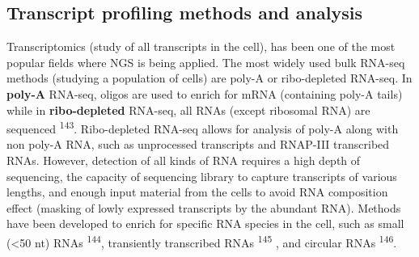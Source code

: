 \documentclass[11pt,twoside]{MPIthesis}
\theoremstyle{definition}
\theoremstyle{definition}
\theoremstyle{definition}
\theoremstyle{remark}
\begin{document}
\subsection{Transcript profiling methods and
analysis}\label{transcript-profiling-methods-and-analysis}

Transcriptomics (study of all transcripts in the cell), has been one of
the most popular fields where NGS is being applied. The most widely used
bulk RNA-seq methods (studying a population of cells) are poly-A or
ribo-depleted RNA-seq. In \textbf{poly-A} RNA-seq, oligos are used to
enrich for mRNA (containing poly-A tails) while in
\textbf{ribo-depleted} RNA-seq, all RNAs (except ribosomal RNA) are
sequenced \textsuperscript{143}. Ribo-depleted RNA-seq allows for
analysis of poly-A along with non poly-A RNA, such as unprocessed
transcripts and RNAP-III transcribed RNAs. However, detection of all
kinds of RNA requires a high depth of sequencing, the capacity of
sequencing library to capture transcripts of various lengths, and enough
input material from the cells to avoid RNA composition effect (masking
of lowly expressed transcripts by the abundant RNA). Methods have been
developed to enrich for specific RNA species in the cell, such as small
(\textless{}50 nt) RNAs \textsuperscript{144}, transiently transcribed
RNAs \textsuperscript{145} , and circular RNAs \textsuperscript{146}.
\end{document}
